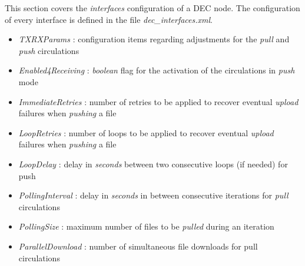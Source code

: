 \documentclass[dec_sum_main.tex]{subfiles}
\begin{document}
This section covers the \textit{interfaces} configuration of a DEC node. The configuration of every interface is defined in the file \textit{dec\_interfaces.xml}.

\par
\noindent
\begin{itemize}
	\item \textit{TXRXParams} : configuration items regarding adjustments for the \textit{pull} and \textit{push} circulations
		\item \textit{Enabled4Receiving} : \textit{boolean} flag for the activation of the circulations in \textit{push} mode
		\item \textit{ImmediateRetries} : number of retries to be applied to recover eventual \textit{upload} failures when \textit{pushing} a file
	\item \textit{LoopRetries} : number of loops to be applied to recover eventual \textit{upload} failures when \textit{pushing} a file
	\item \textit{LoopDelay} : delay in \textit{seconds} between two consecutive loops (if needed) for push
	\item \textit{PollingInterval} : delay in \textit{seconds} in between consecutive iterations for \textit{pull} circulations
	\item \textit{PollingSize} : maximum number of files to be \textit{pulled} during an iteration   
	\item \textit{ParallelDownload} : number of simultaneous file downloads for pull circulations
\end{itemize}

\label{TXRXParams}
\end{document}
